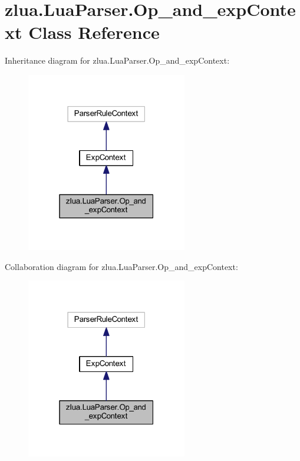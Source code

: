 \hypertarget{classzlua_1_1_lua_parser_1_1_op__and__exp_context}{}\section{zlua.\+Lua\+Parser.\+Op\+\_\+and\+\_\+exp\+Context Class Reference}
\label{classzlua_1_1_lua_parser_1_1_op__and__exp_context}


Inheritance diagram for zlua.\+Lua\+Parser.\+Op\+\_\+and\+\_\+exp\+Context\+:
\nopagebreak
\begin{figure}[H]
\begin{center}
\leavevmode
\includegraphics[width=199pt]{classzlua_1_1_lua_parser_1_1_op__and__exp_context__inherit__graph}
\end{center}
\end{figure}


Collaboration diagram for zlua.\+Lua\+Parser.\+Op\+\_\+and\+\_\+exp\+Context\+:
\nopagebreak
\begin{figure}[H]
\begin{center}
\leavevmode
\includegraphics[width=199pt]{classzlua_1_1_lua_parser_1_1_op__and__exp_context__coll__graph}
\end{center}
\end{figure}
